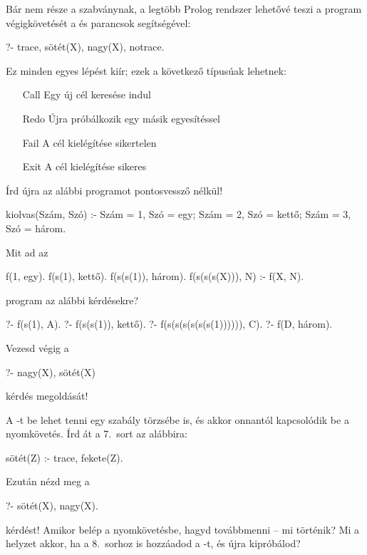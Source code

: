 Bár nem része a szabványnak, a legtöbb Prolog
rendszer lehetővé teszi a program végigkövetését a
 és  parancsok segítségével:
\begin{query}
?- trace, sötét(X), nagy(X), notrace.
\end{query}

Ez minden egyes lépést kiír; ezek a következő
típusúak lehetnek:
\begin{itemize}
\item [Call] Egy új cél keresése indul
\item [Redo] Újra próbálkozik egy másik egyesítéssel
\item [Fail] A cél kielégítése sikertelen
\item [Exit] A cél kielégítése sikeres
\end{itemize}

\begin{problem}
Írd újra az alábbi programot pontosvessző nélkül!
\begin{program}
kiolvas(Szám, Szó) :-
    Szám = 1, Szó = egy;
    Szám = 2, Szó = kettő;
    Szám = 3, Szó = három.
\end{program}
\end{problem}
\begin{problem}
Mit ad az
\begin{program}
f(1, egy).
f(s(1), kettő).
f(s(s(1)), három).
f(s(s(s(X))), N) :- f(X, N).
\end{program}       
program az alábbi kérdésekre?
\begin{query}
?- f(s(1), A).
?- f(s(s(1)), kettő).
?- f(s(s(s(s(s(s(1)))))), C).
?- f(D, három).
\end{query}
\end{problem}
\begin{problem}
Vezesd végig a
\begin{query}
?- nagy(X), sötét(X)
\end{query}
kérdés megoldását!
\end{problem}
\begin{problem}
A -t be lehet tenni egy szabály törzsébe
is, és akkor onnantól kapcsolódik be a
nyomkövetés. Írd át a 7.~sort az alábbira:
\begin{program}
sötét(Z) :- trace, fekete(Z).
\end{program}
Ezután nézd meg a
\begin{query}
?- sötét(X), nagy(X).
\end{query}
kérdést! Amikor belép a nyomkövetésbe, hagyd
továbbmenni -- mi történik? Mi a helyzet akkor, ha a
8.~sorhoz is hozzáadod a -t, és újra
kipróbálod?
\end{problem}

